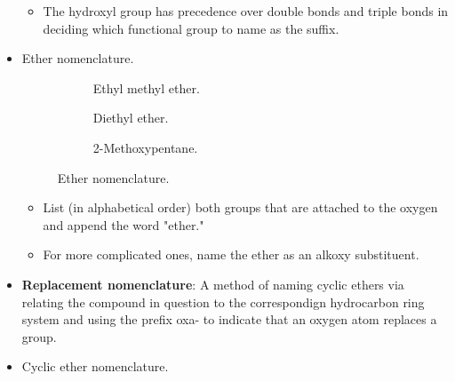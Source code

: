 \documentclass[../notes.tex]{subfiles}
\begin{document}
\begin{itemize}
\begin{itemize}
        \item The hydroxyl group has precedence over double bonds and triple bonds in deciding which functional group to name as the suffix.
    \end{itemize}
    \item Ether nomenclature.
    \begin{figure}[h!]
        \centering
        \footnotesize
        \begin{subfigure}[b]{0.33\linewidth}
            \centering
            \vspace{1em}
            \caption{Ethyl methyl ether.}
            \label{fig:etherNomenclaturea}
        \end{subfigure}
        \begin{subfigure}[b]{0.32\linewidth}
            \centering
            \vspace{1em}
            \caption{Diethyl ether.}
            \label{fig:etherNomenclatureb}
        \end{subfigure}
        \begin{subfigure}[b]{0.33\linewidth}
            \centering
            \vspace{1em}
            \caption{2-Methoxypentane.}
            \label{fig:etherNomenclaturec}
        \end{subfigure}
        \caption{Ether nomenclature.}
        \label{fig:etherNomenclature}
    \end{figure}
    \begin{itemize}
        \item List (in alphabetical order) both groups that are attached to the oxygen and append the word "ether."
        \item For more complicated ones, name the ether as an alkoxy substituent.
    \end{itemize}
    \item \textbf{Replacement nomenclature}: A method of naming cyclic ethers via relating the compound in question to the correspondign hydrocarbon ring system and using the prefix oxa- to indicate that an oxygen atom replaces a  group.
    \item Cyclic ether nomenclature.
    \begin{figure}[H]
        \centering
        \footnotesize
        \captionsetup{justification=centering}
        \begin{subfigure}[b]{0.24\linewidth}

\end{subfigure}
\end{figure}
\end{itemize}
\end{document}
